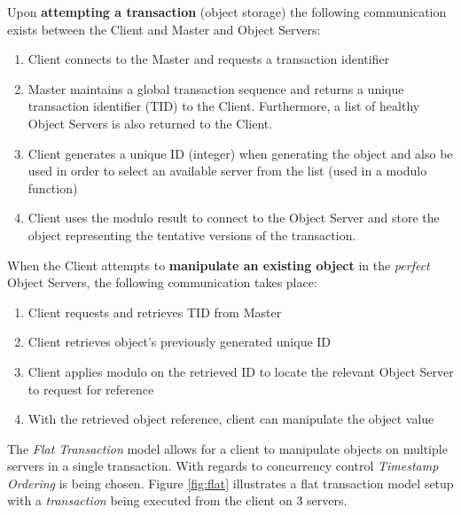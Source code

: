 \documentclass[times, 10pt,twocolumn]{article}
\begin{document}
Upon {\bf attempting a transaction} (object storage) the following communication exists between the Client and Master and Object Servers: 

\begin{enumerate}
\item Client connects to the Master and requests a transaction identifier 
\item Master maintains a global transaction sequence and returns a unique transaction identifier (TID) to the Client. Furthermore, a list of healthy Object Servers is also returned to the Client. 
\item Client generates a unique ID (integer) when generating the object and also be used in order to select an available server from the list (used in a modulo function)
\item Client uses the modulo result to connect to the Object Server and store the object representing the tentative versions of the transaction.
\end{enumerate}

When the Client attempts to {\bf manipulate an existing object} in the {\it perfect} Object Servers, the following communication takes place:
\begin{enumerate}
\item Client requests and retrieves TID from Master
\item Client retrieves object's previously generated unique ID
\item Client applies modulo on the retrieved ID to locate the relevant Object Server to request for reference
\item With the retrieved object reference, client can manipulate the object value
\end{enumerate}

\label{subsec:transmgt}
The {\it Flat Transaction} model allows for a client to manipulate objects on multiple servers in a single transaction. With regards to concurrency control {\it Timestamp Ordering} is being chosen. Figure \ref{fig:flat} illustrates a flat transaction model setup with a {\it transaction} being executed from the client on 3 servers.
\end{document}
